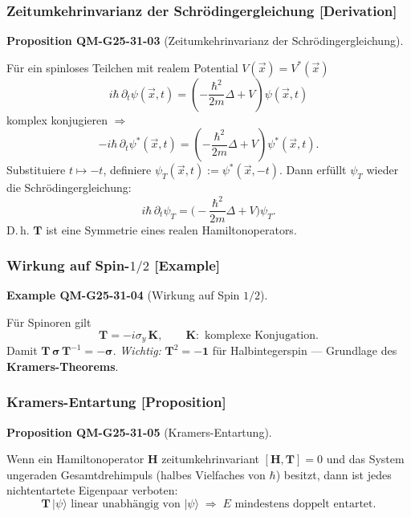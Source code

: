 \documentclass[10pt, letterpaper]{article}
\newcommand{\CustomHeading}[3]{%
  \par\medskip\noindent%
  \textbf{#1 #2} \textnormal{(#3)}.\enskip%
}
\newenvironment{PROP}[2]{\begin{unitbox}\CustomHeading{Proposition}{#1}{#2}}{\end{unitbox}}
\newenvironment{EXA}[2]{\begin{unitbox}\CustomHeading{Example}{#1}{#2}}{\end{unitbox}}
\begin{document}

\subsubsection*{Zeitumkehrinvarianz der Schrödingergleichung [Derivation]}


\begin{PROP}{QM-G25-31-03}{Zeitumkehrinvarianz der Schrödingergleichung}
Für ein spinloses Teilchen mit realem Potential
$V(\vec x)=V^{\!*}(\vec x)$
\[
  i\hbar\,\partial_t\psi(\vec x,t)
  =\left(-\frac{\hbar^2}{2m}\Delta+V\right)\psi(\vec x,t)
\]
komplex konjugieren $\Rightarrow$
\[
  -i\hbar\,\partial_t
  \psi^{\!*}(\vec x,t)
  =\left(-\frac{\hbar^2}{2m}\Delta+V\right)
   \psi^{\!*}(\vec x,t).
\]
Substituiere $t\mapsto -t$,
definiere $\psi_T(\vec x,t):=\psi^{\!*}(\vec x,-t)$.
Dann erfüllt $\psi_T$ wieder die Schrödingergleichung:
\[
  i\hbar\,\partial_t\psi_T
  =\bigl(-\frac{\hbar^2}{2m}\Delta+V\bigr)\psi_T .
\]
D.\,h. $\mathbf T$ ist eine Symmetrie eines
realen Hamiltonoperators.
\end{PROP}


\subsubsection*{Wirkung auf Spin-$1/2$ [Example]}

\begin{EXA}{QM-G25-31-04}{Wirkung auf Spin $1/2$}
Für Spinoren gilt
\[
  \mathbf T= -i\sigma_y\,\mathbf K,
  \qquad
  \mathbf K:\text{ komplexe Konjugation}.
\]
Damit
\(
  \mathbf T\,\boldsymbol\sigma\,\mathbf T^{-1} = -\boldsymbol\sigma.
\)
\emph{Wichtig:}  \(
  \mathbf T^2 = -\mathbf 1
\)
für Halbintegerspin — Grundlage des
\textbf{Kramers-Theorems}.
\end{EXA}


\subsubsection*{Kramers-Entartung [Proposition]}


\begin{PROP}{QM-G25-31-05}{Kramers-Entartung}
Wenn ein Hamiltonoperator $\mathbf H$ zeitumkehrinvariant
\(
  [\mathbf H,\mathbf T]=0
\)
und das System ungeraden Gesamtdrehimpuls
(halbes Vielfaches von $\hbar$)
besitzt, dann ist jedes nichtentartete Eigenpaar verboten:
\[
  \mathbf T\,|\psi\rangle
  \text{ linear unabhängig von }|\psi\rangle
  \;\Longrightarrow\;
  E\text{ mindestens doppelt entartet}.
\]
\end{PROP}
\end{document}
